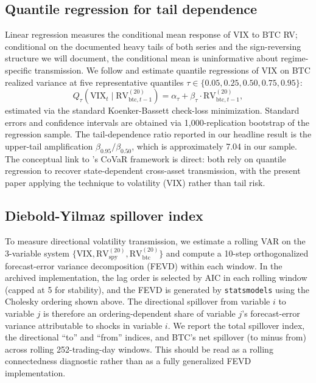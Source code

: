 \documentclass[11pt,a4paper]{article}
\begin{document}
\subsection{Quantile regression for tail dependence}
\label{subsec:qr}

Linear regression measures the conditional mean response of VIX to BTC RV; conditional on the documented heavy tails of both series and the sign-reversing structure we will document, the conditional mean is uninformative about regime-specific transmission. We follow \citet{koenker1978} and estimate quantile regressions of VIX on BTC realized variance at five representative quantiles $\tau \in \{0.05, 0.25, 0.50, 0.75, 0.95\}$:
\begin{equation}
Q_{\tau}(\text{VIX}_t \mid \text{RV}^{(20)}_{\text{btc}, t-1}) = \alpha_\tau + \beta_\tau \cdot \text{RV}^{(20)}_{\text{btc}, t-1},
\label{eq:qr}
\end{equation}
estimated via the standard Koenker-Bassett check-loss minimization. Standard errors and confidence intervals are obtained via 1{,}000-replication bootstrap of the regression sample. The tail-dependence ratio reported in our headline result is the upper-tail amplification $\beta_{0.95} / \beta_{0.50}$, which is approximately 7.04 in our sample. The conceptual link to \citet{adrian2016}'s CoVaR framework is direct: both rely on quantile regression to recover state-dependent cross-asset transmission, with the present paper applying the technique to volatility (VIX) rather than tail risk.

\subsection{Diebold-Yilmaz spillover index}
\label{subsec:dy}

To measure directional volatility transmission, we estimate a rolling VAR on the 3-variable system $\{\text{VIX}, \text{RV}^{(20)}_{\text{spy}}, \text{RV}^{(20)}_{\text{btc}}\}$ and compute a 10-step orthogonalized forecast-error variance decomposition (FEVD) within each window. In the archived implementation, the lag order is selected by AIC in each rolling window (capped at 5 for stability), and the FEVD is generated by \texttt{statsmodels} using the Cholesky ordering shown above. The directional spillover from variable $i$ to variable $j$ is therefore an ordering-dependent share of variable $j$'s forecast-error variance attributable to shocks in variable $i$. We report the total spillover index, the directional ``to'' and ``from'' indices, and BTC's net spillover (to minus from) across rolling 252-trading-day windows. This should be read as a rolling connectedness diagnostic rather than as a fully generalized FEVD implementation.
\end{document}
